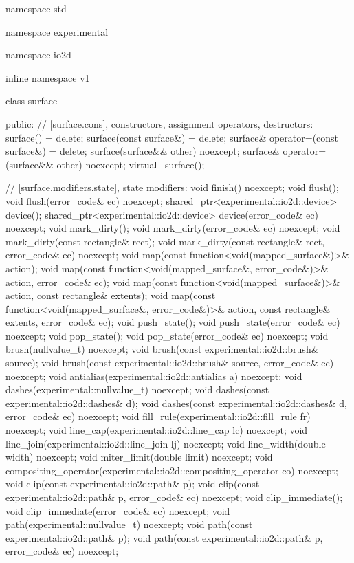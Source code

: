\begin{codeblock}
namespace std { namespace experimental { namespace io2d { inline namespace v1 {
  class surface {
  public:
    // \ref{surface.cons}, constructors, assignment operators, destructors:
    surface() = delete;
    surface(const surface&) = delete;
    surface& operator=(const surface&) = delete;
    surface(surface&& other) noexcept;
    surface& operator=(surface&& other) noexcept;
    virtual ~surface();

    // \ref{surface.modifiers.state}, state modifiers:
    void finish() noexcept;
    void flush();
    void flush(error_code& ec) noexcept;
    shared_ptr<experimental::io2d::device> device();
    shared_ptr<experimental::io2d::device> device(error_code& ec) noexcept;
    void mark_dirty();
    void mark_dirty(error_code& ec) noexcept;
    void mark_dirty(const rectangle& rect);
    void mark_dirty(const rectangle& rect, error_code& ec) noexcept;
    void map(const function<void(mapped_surface&)>& action);
    void map(const function<void(mapped_surface&, error_code&)>& action,
      error_code& ec);
    void map(const function<void(mapped_surface&)>& action,
      const rectangle& extents);
    void map(const function<void(mapped_surface&, error_code&)>& action,
      const rectangle& extents, error_code& ec);
    void push_state();
    void push_state(error_code& ec) noexcept;
    void pop_state();
    void pop_state(error_code& ec) noexcept;
    void brush(nullvalue_t) noexcept;
    void brush(const experimental::io2d::brush& source);
    void brush(const experimental::io2d::brush& source, error_code& ec)
      noexcept;
    void antialias(experimental::io2d::antialias a) noexcept;
    void dashes(experimental::nullvalue_t) noexcept;
    void dashes(const experimental::io2d::dashes& d);
    void dashes(const experimental::io2d::dashes& d, error_code& ec) noexcept;
    void fill_rule(experimental::io2d::fill_rule fr) noexcept;
    void line_cap(experimental::io2d::line_cap lc) noexcept;
    void line_join(experimental::io2d::line_join lj) noexcept;
    void line_width(double width) noexcept;
    void miter_limit(double limit) noexcept;
    void compositing_operator(experimental::io2d::compositing_operator co)
      noexcept;
    void clip(const experimental::io2d::path& p);
    void clip(const experimental::io2d::path& p, error_code& ec) noexcept;
    void clip_immediate();
    void clip_immediate(error_code& ec) noexcept;
    void path(experimental::nullvalue_t) noexcept;
    void path(const experimental::io2d::path& p);
    void path(const experimental::io2d::path& p, error_code& ec) noexcept;

}}}}}
\end{codeblock}
